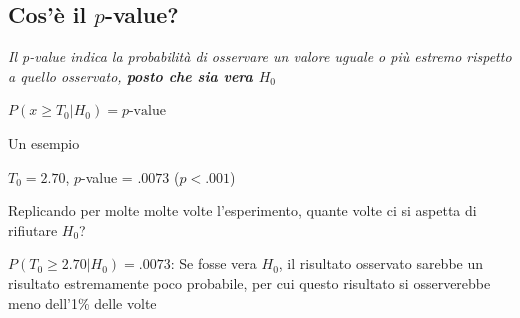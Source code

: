 \documentclass[compress, xcolor=table]{beamer}
\begin{document}
%	
%		
%		
%		
%	
%	
%	
%	
		
\subsection{Cos'è il $p$-value?}		
\begin{frame}
	
\begin{center}
	\emph{Il p-value indica la probabilità di osservare un valore uguale o più estremo rispetto a quello osservato, \textbf{posto che sia vera $H_0$}}
	
	$P(x \geq T_0|H_0) = p\text{-value}$
\end{center}


\begin{exampleblock}{Un esempio}
	
	$T_0 = 2.70$, $p$-value = $.0073$ ($p < .001$)
	 
	 Replicando per molte molte volte l'esperimento, quante volte ci si aspetta di rifiutare $H_0$? 
	 
	 \pause
	 
	 $P(T_0 \geq 2.70|H_0) = .0073$: Se fosse vera $H_0$, il risultato osservato sarebbe un risultato estremamente poco probabile, per cui questo risultato si osserverebbe meno dell'1\% delle volte
\end{exampleblock}

\end{frame}	
\end{document}
